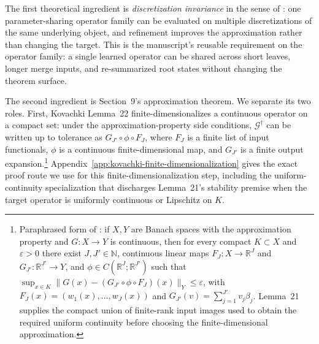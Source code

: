 The first theoretical ingredient is \emph{discretization invariance} in
the sense of \citet[Section~2.3]{Kovachki23NeuralOperator}: one
parameter-sharing operator family can be evaluated on multiple
discretizations of the same underlying object, and refinement improves
the approximation rather than changing the target. This is the
manuscript's reusable requirement on the operator family: a single
learned operator can be shared across short leaves, longer merge inputs,
and re-summarized root states without changing the theorem surface.

The second ingredient is Section~9's approximation theorem. We separate
its two roles. First, Kovachki Lemma~22 finite-dimensionalizes a
continuous operator on a compact set: under the approximation-property
side conditions, $\mathcal{G}^\dagger$ can be written up to tolerance as
$G_{J'}\circ\phi\circ F_J$, where $F_J$ is a finite list of input
functionals, $\phi$ is a continuous finite-dimensional map, and $G_{J'}$
is a finite output expansion.\footnote{Paraphrased form of
\citet[Lemma~22]{Kovachki23NeuralOperator}: if $X,Y$ are Banach spaces
with the approximation property and $G:X\to Y$ is continuous, then for
every compact $K\subset X$ and $\varepsilon>0$ there exist
$J,J'\in\mathbb{N}$, continuous linear maps
$F_J:X\to\mathbb{R}^J$ and $G_{J'}:\mathbb{R}^{J'}\to Y$, and
$\phi\in C(\mathbb{R}^J;\mathbb{R}^{J'})$ such that
$\sup_{x\in K}\|G(x)-(G_{J'}\circ\phi\circ F_J)(x)\|_Y\le\varepsilon$,
with $F_J(x)=(w_1(x),\ldots,w_J(x))$ and
$G_{J'}(v)=\sum_{j=1}^{J'}v_j\beta_j$. Lemma~21 supplies the compact
union of finite-rank input images used to obtain the required uniform
continuity before choosing the finite-dimensional approximation.}
Appendix~\ref{app:kovachki-finite-dimensionalization} gives the exact proof
route we use for this finite-dimensionalization step, including the
uniform-continuity specialization that discharges Lemma~21's stability
premise when the target operator is uniformly continuous or Lipschitz on
$K$.

